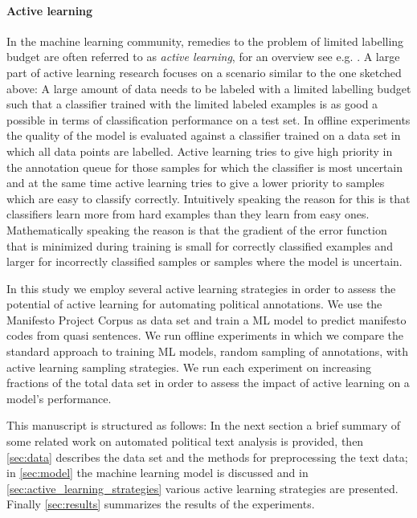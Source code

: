 \documentclass[runningheads,a4paper]{article}
\begin{document}
\paragraph{Active learning}
In the machine learning community, remedies to the problem of limited labelling budget are often referred to as \textit{active learning}, for an overview see e.g. \cite{2012Settles}. A large part of active learning research focuses on a scenario similar to the one sketched above: A large amount of data needs to be labeled with a limited labelling budget such that a classifier trained with the limited labeled examples is as good a possible in terms of classification performance on a test set. In offline experiments the quality of the model is evaluated against a classifier trained on a data set in which all data points are labelled. 
Active learning tries to give high priority in the annotation queue for those samples for which the classifier is most uncertain and at the same time active learning tries to give a lower priority to samples which are easy to classify correctly. Intuitively speaking the reason for this is that classifiers learn more from hard examples than they learn from easy ones. Mathematically speaking the reason is that the gradient of the error function that is minimized during training is small for correctly classified examples and larger for incorrectly classified samples or samples where the model is uncertain.

In this study we employ several active learning strategies in order to assess the potential of active learning for automating political annotations. We use the Manifesto Project Corpus as data set and train a ML model to predict manifesto codes from quasi sentences. We run offline experiments in which we compare the standard approach to training ML models, random sampling of annotations, with active learning sampling strategies. We run each experiment on increasing fractions of the total data set in order to assess the impact of active learning on a model's performance. 

This manuscript is structured as follows: In the next section a brief summary of some related work on automated political text analysis is provided, then \autoref{sec:data} describes the data set and the methods for preprocessing the text data; in \autoref{sec:model} the machine learning model is discussed and in \autoref{sec:active_learning_strategies} various active learning strategies are presented. Finally \autoref{sec:results} summarizes the results of the experiments. 
\end{document}
